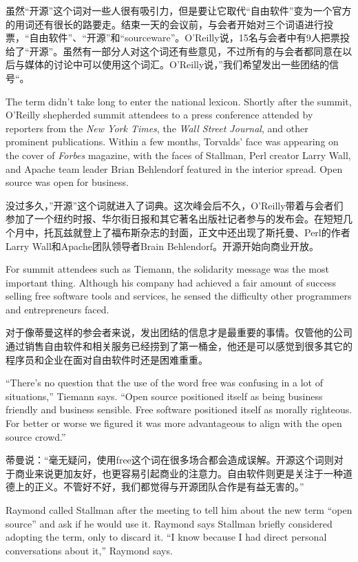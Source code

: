 \ifdefined\chs
虽然``开源''这个词对一些人很有吸引力，但是要让它取代``自由软件''变为一个官方的用词还有很长的路要走。结束一天的会议前，与会者开始对三个词语进行投票，``自由软件''、``开源''和``sourceware''。O'Reilly说，15名与会者中有9人把票投给了``开源''。虽然有一部分人对这个词还有些意见，不过所有的与会者都同意在以后与媒体的讨论中可以使用这个词汇。O'Reilly说，''我们希望发出一些团结的信号``。
\fi

\ifdefined\eng
The term didn't take long to enter the national lexicon. Shortly after the summit, O'Reilly shepherded summit attendees to a press conference attended by reporters from the \textit{New York Times}, the \textit{Wall Street Journal}, and other prominent publications. Within a few months, Torvalds' face was appearing on the cover of \textit{Forbes} magazine, with the faces of Stallman, Perl creator Larry Wall, and Apache team leader Brian Behlendorf featured in the interior spread. Open source was open for business.
\fi

\ifdefined\chs
没过多久，''开源''这个词就进入了词典。这次峰会后不久，O'Reilly带着与会者们参加了一个纽约时报、华尔街日报和其它著名出版社记者参与的发布会。在短短几个月中，托瓦兹就登上了福布斯杂志的封面，正文中还出现了斯托曼、Perl的作者Larry Wall和Apache团队领导者Brain Behlendorf。开源开始向商业开放。
\fi

\ifdefined\eng
For summit attendees such as Tiemann, the solidarity message was the most important thing. Although his company had achieved a fair amount of success selling free software tools and services, he sensed the difficulty other programmers and entrepreneurs faced.
\fi

\ifdefined\chs
对于像蒂曼这样的参会者来说，发出团结的信息才是最重要的事情。仅管他的公司通过销售自由软件和相关服务已经捞到了第一桶金，他还是可以感觉到很多其它的程序员和企业在面对自由软件时还是困难重重。
\fi

\ifdefined\eng
``There's no question that the use of the word free was confusing in a lot of situations,'' Tiemann says. ``Open source positioned itself as being business friendly and business sensible. Free software positioned itself as morally righteous. For better or worse we figured it was more advantageous to align with the open source crowd.''
\fi

\ifdefined\chs
蒂曼说：``毫无疑问，使用free这个词在很多场合都会造成误解。开源这个词则对于商业来说更加友好，也更容易引起商业的注意力。自由软件则更是关注于一种道德上的正义。不管好不好，我们都觉得与开源团队合作是有益无害的。''
\fi

\ifdefined\eng
Raymond called Stallman after the meeting to tell him about the new term ``open source'' and ask if he would use it.  Raymond says Stallman briefly considered adopting the term, only to discard it. ``I know because I had direct personal conversations about it,'' Raymond says.
\fi

